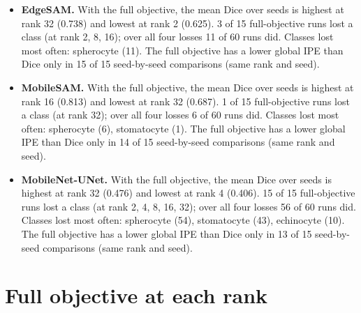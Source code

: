 \documentclass[10pt]{article}
\begin{document}
\begin{itemize}\itemsep3pt
\item \textbf{EdgeSAM.} With the full objective, the mean Dice over seeds is highest at rank 32 (0.738) and lowest at rank 2 (0.625). 3 of 15 full-objective runs lost a class (at rank 2, 8, 16); over all four losses 11 of 60 runs did. Classes lost most often: spherocyte (11). The full objective has a lower global IPE than Dice only in 15 of 15 seed-by-seed comparisons (same rank and seed).
\item \textbf{MobileSAM.} With the full objective, the mean Dice over seeds is highest at rank 16 (0.813) and lowest at rank 32 (0.687). 1 of 15 full-objective runs lost a class (at rank 32); over all four losses 6 of 60 runs did. Classes lost most often: spherocyte (6), stomatocyte (1). The full objective has a lower global IPE than Dice only in 14 of 15 seed-by-seed comparisons (same rank and seed).
\item \textbf{MobileNet-UNet.} With the full objective, the mean Dice over seeds is highest at rank 32 (0.476) and lowest at rank 4 (0.406). 15 of 15 full-objective runs lost a class (at rank 2, 4, 8, 16, 32); over all four losses 56 of 60 runs did. Classes lost most often: spherocyte (54), stomatocyte (43), echinocyte (10). The full objective has a lower global IPE than Dice only in 13 of 15 seed-by-seed comparisons (same rank and seed).
\end{itemize}

\section*{Full objective at each rank}
\end{document}
